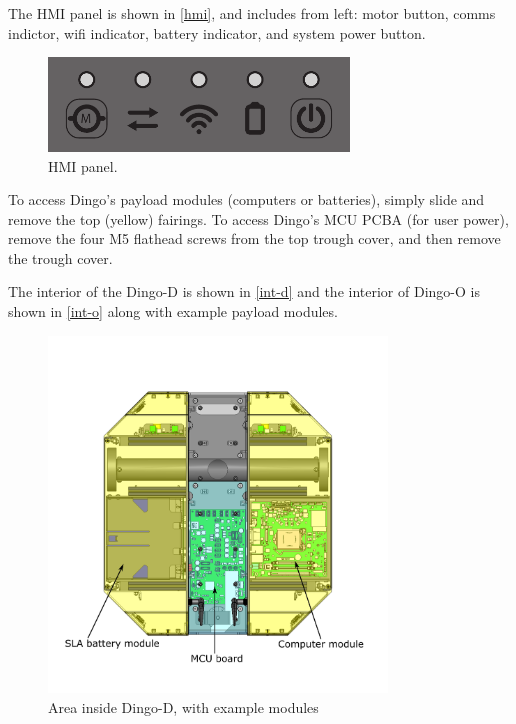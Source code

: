 \documentclass[]{clearpath-latex/clearpath-manual}
\begin{document}
The HMI panel is shown in
\autoref{hmi}, and includes from left: motor button, comms indictor, wifi indicator, battery
indicator, and system power button.

\begin{figure}[ht]
  \centering
  \includegraphics[width=8.0cm]{hmi.pdf}
  \caption{HMI panel.}
  \label{hmi}
\end{figure}

To access Dingo's payload modules (computers or batteries), simply slide and remove the top (yellow) fairings. To access Dingo's MCU PCBA (for user power), remove the four M5 flathead screws from the top trough cover, and then remove the trough cover.

The interior of the Dingo-D is shown in \autoref{int-d} and the interior of Dingo-O is shown in \autoref{int-o} along with example payload modules.

\begin{figure}[pt]
  \centering
  \includegraphics[width=9.0cm]{dingo-d-int.pdf}
  \caption{Area inside Dingo-D, with example modules}
  \label{int-d}
\end{figure}
\end{document}
